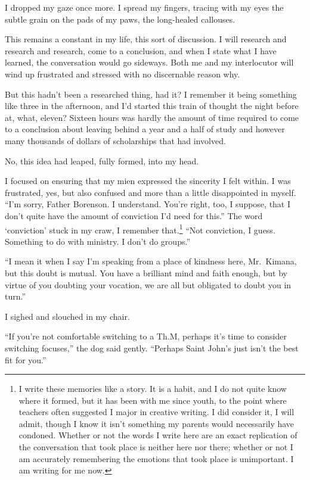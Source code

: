 I dropped my gaze once more. I spread my fingers, tracing with my eyes the subtle grain on the pads of my paws, the long-healed callouses.

This remains a constant in my life, this sort of discussion. I will research and research and research, come to a conclusion, and when I state what I have learned, the conversation would go sideways. Both me and my interlocutor will wind up frustrated and stressed with no discernable reason why.

But this hadn't been a researched thing, had it? I remember it being something like three in the afternoon, and I'd started this train of thought the night before at, what, eleven? Sixteen hours was hardly the amount of time required to come to a conclusion about leaving behind a year and a half of study and however many thousands of dollars of scholarships that had involved.

No, this idea had leaped, fully formed, into my head.

I focused on ensuring that my mien expressed the sincerity I felt within. I was frustrated, yes, but also confused and more than a little disappointed in myself. ``I'm sorry, Father Borenson. I understand. You're right, too, I suppose, that I don't quite have the amount of conviction I'd need for this.'' The word `conviction' stuck in my craw, I remember that.\footnote{I write these memories like a story. It is a habit, and I do not quite know where it formed, but it has been with me since youth, to the point where teachers often suggested I major in creative writing. I did consider it, I will admit, though I know it isn't something my parents would necessarily have condoned. Whether or not the words I write here are an exact replication of the conversation that took place is neither here nor there; whether or not I am accurately remembering the emotions that took place is unimportant. I am writing for me now.} ``Not conviction, I guess. Something to do with ministry. I don't do groups.''

``I mean it when I say I'm speaking from a place of kindness here, Mr.~Kimana, but this doubt is mutual. You have a brilliant mind and faith enough, but by virtue of you doubting your vocation, we are all but obligated to doubt you in turn.''

I sighed and slouched in my chair.

``If you're not comfortable switching to a Th.M, perhaps it's time to consider switching focuses,'' the dog said gently. ``Perhaps Saint John's just isn't the best fit for you.''

